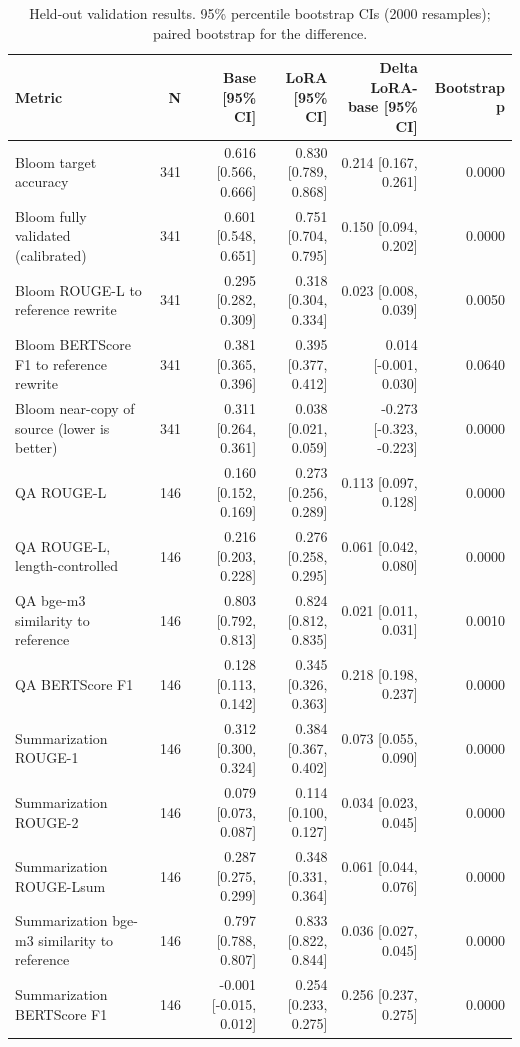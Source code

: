 \begin{table}[t]
\centering
\caption{Held-out validation results. 95\% percentile bootstrap CIs (2000 resamples); paired bootstrap for the difference.}
\label{tab:t3_main_results}
\begin{tabular}{lrrrrr}
\toprule
Metric & N & Base [95\% CI] & LoRA [95\% CI] & Delta LoRA-base [95\% CI] & Bootstrap p \\
\midrule
Bloom target accuracy & 341 & 0.616 [0.566, 0.666] & 0.830 [0.789, 0.868] & 0.214 [0.167, 0.261] & 0.0000 \\
Bloom fully validated (calibrated) & 341 & 0.601 [0.548, 0.651] & 0.751 [0.704, 0.795] & 0.150 [0.094, 0.202] & 0.0000 \\
Bloom ROUGE-L to reference rewrite & 341 & 0.295 [0.282, 0.309] & 0.318 [0.304, 0.334] & 0.023 [0.008, 0.039] & 0.0050 \\
Bloom BERTScore F1 to reference rewrite & 341 & 0.381 [0.365, 0.396] & 0.395 [0.377, 0.412] & 0.014 [-0.001, 0.030] & 0.0640 \\
Bloom near-copy of source (lower is better) & 341 & 0.311 [0.264, 0.361] & 0.038 [0.021, 0.059] & -0.273 [-0.323, -0.223] & 0.0000 \\
QA ROUGE-L & 146 & 0.160 [0.152, 0.169] & 0.273 [0.256, 0.289] & 0.113 [0.097, 0.128] & 0.0000 \\
QA ROUGE-L, length-controlled & 146 & 0.216 [0.203, 0.228] & 0.276 [0.258, 0.295] & 0.061 [0.042, 0.080] & 0.0000 \\
QA bge-m3 similarity to reference & 146 & 0.803 [0.792, 0.813] & 0.824 [0.812, 0.835] & 0.021 [0.011, 0.031] & 0.0010 \\
QA BERTScore F1 & 146 & 0.128 [0.113, 0.142] & 0.345 [0.326, 0.363] & 0.218 [0.198, 0.237] & 0.0000 \\
Summarization ROUGE-1 & 146 & 0.312 [0.300, 0.324] & 0.384 [0.367, 0.402] & 0.073 [0.055, 0.090] & 0.0000 \\
Summarization ROUGE-2 & 146 & 0.079 [0.073, 0.087] & 0.114 [0.100, 0.127] & 0.034 [0.023, 0.045] & 0.0000 \\
Summarization ROUGE-Lsum & 146 & 0.287 [0.275, 0.299] & 0.348 [0.331, 0.364] & 0.061 [0.044, 0.076] & 0.0000 \\
Summarization bge-m3 similarity to reference & 146 & 0.797 [0.788, 0.807] & 0.833 [0.822, 0.844] & 0.036 [0.027, 0.045] & 0.0000 \\
Summarization BERTScore F1 & 146 & -0.001 [-0.015, 0.012] & 0.254 [0.233, 0.275] & 0.256 [0.237, 0.275] & 0.0000 \\
\bottomrule
\end{tabular}
\end{table}
